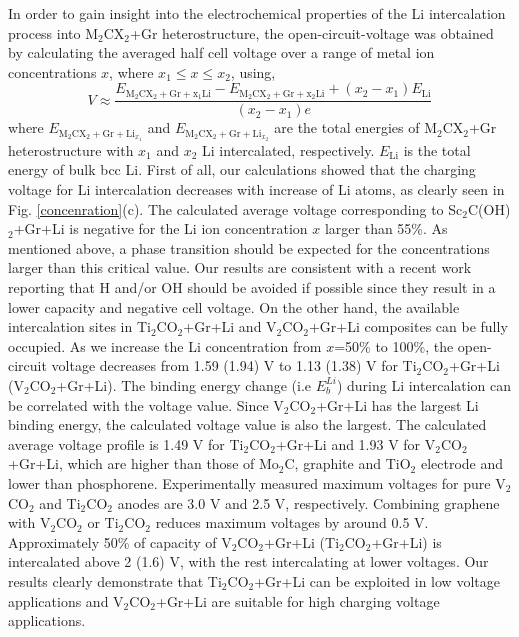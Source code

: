 In order to gain insight into the electrochemical properties of the Li intercalation process into M$_2$CX$_2$+Gr heterostructure, the open-circuit-voltage was obtained by calculating the averaged half cell voltage over a range of metal ion concentrations $x$, where $x_1\leq x\leq x_2$, using,
\begin{equation}
V\approx\frac{E_{\mathrm{M}_2\mathrm{C}\mathrm{X}_2+\mathrm{Gr}+\mathrm{x_1Li}}-E_{\mathrm{M}_2\mathrm{C}\mathrm{X}_2+\mathrm{Gr}+\mathrm{x_2Li}}+(x_2-x_1)E_{\mathrm{Li}}}{(x_2-x_1)e}
\end{equation}
where $E_{\mathrm{M}_2\mathrm{C}\mathrm{X}_2+\mathrm{Gr}+\mathrm{Li}_{x_1}}$ and $E_{\mathrm{M}_2\mathrm{C}\mathrm{X}_2+\mathrm{Gr}+\mathrm{Li}_{x_2}}$ are the total energies of M$_2$CX$_2$+Gr heterostructure with $x_1$ and $x_2$ Li intercalated, respectively.  $E_{\mathrm{Li}}$ is the total energy of bulk bcc Li.  First of all, our calculations showed that the charging voltage for Li intercalation decreases with increase of Li atoms, as clearly seen in Fig. \ref{concenration}(c). The calculated average voltage corresponding to Sc$_2$C(OH)$_2$+Gr+Li is negative for the Li ion concentration $x$ larger than 55\%. As mentioned above, a phase transition should be expected for the concentrations larger than this critical value. Our results are consistent with a recent work reporting that H and/or OH should be avoided if possible since they result in a lower capacity and negative cell voltage\cite{Xie2014,Tang2012}. On the other hand, the available intercalation sites in Ti$_2$CO$_2$+Gr+Li and V$_2$CO$_2$+Gr+Li composites can be fully occupied.
As we increase the Li concentration from $x$=50\% to 100\%, the open-circuit voltage decreases from 1.59 (1.94) V to 1.13 (1.38) V for Ti$_2$CO$_2$+Gr+Li (V$_2$CO$_2$+Gr+Li). The binding energy change (i.e $E_{b}^{Li}$) during Li intercalation can be correlated with the voltage value. Since V$_2$CO$_2$+Gr+Li has the largest Li binding energy, the calculated voltage value is also the largest. The calculated average voltage profile is 1.49 V for Ti$_2$CO$_2$+Gr+Li and 1.93 V for V$_2$CO$_2$+Gr+Li, which are higher than those of Mo$_2$C\cite{C6TA01918H}, graphite\cite{ceder4} and TiO$_2$ electrode \cite{tio2-voltage} and lower than phosphorene\cite{doi:10.1021/nl504336h}. Experimentally measured maximum voltages for pure V$_2$CO$_2$ and Ti$_2$CO$_2$ anodes are 3.0 V and 2.5 V, respectively\cite{doi:10.1021/ja405735d,gdgdgd}. Combining graphene with V$_2$CO$_2$ or Ti$_2$CO$_2$ reduces maximum voltages by around 0.5 V.  Approximately 50\% of capacity of V$_2$CO$_2$+Gr+Li (Ti$_2$CO$_2$+Gr+Li) is intercalated above 2 (1.6) V, with the rest intercalating at lower voltages. Our results clearly demonstrate that Ti$_2$CO$_2$+Gr+Li can be exploited in low voltage applications and V$_2$CO$_2$+Gr+Li are suitable for high charging voltage applications.

